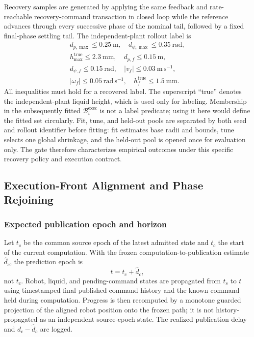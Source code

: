 Recovery samples are generated by applying the same feedback and
rate-reachable recovery-command transaction in closed loop while the reference advances through every
successive phase of the nominal tail, followed by a fixed final-phase settling
tail.  The independent-plant rollout label is
\begin{equation}
\begin{gathered}
  d_{p,\max}\le0.25~\mathrm{m},\quad
  d_{\psi,\max}\le0.35~\mathrm{rad},\\
  h_{\max}^{\mathrm{true}}\le2.3~\mathrm{mm},\quad
  d_{p,f}\le0.15~\mathrm{m},\\
  d_{\psi,f}\le0.15~\mathrm{rad},\quad
  |v_f|\le0.03~\mathrm{m\,s^{-1}},\\
  |\omega_f|\le0.05~\mathrm{rad\,s^{-1}},\quad
  h_f^{\mathrm{true}}\le1.5~\mathrm{mm}.
\end{gathered}
\label{eq:recovery_rollout_label}
\end{equation}
All inequalities must hold for a recovered label.  The superscript ``true''
denotes the independent-plant liquid height, which is used only for labeling.
Membership in the subsequently fitted $\mathcal B_i^{\mathrm{exec}}$ is not a
label predicate; using it here would define the fitted set circularly.  Fit,
tune, and held-out pools are separated by both seed and rollout identifier before fitting:
fit estimates base radii and bounds, tune selects one global shrinkage, and the
held-out pool is opened once for evaluation only.  The gate therefore
characterizes empirical outcomes under this specific recovery policy and
execution contract.

\subsection{Execution-Front Alignment and Phase Rejoining}

\subsubsection{Expected publication epoch and horizon}

Let $t_s$ be the common source epoch of the latest admitted state and $t_c$ the
start of the current computation.  With the frozen computation-to-publication
estimate $\widehat d_c$, the prediction epoch is
\begin{equation}
  t=t_c+\widehat d_c,
  \label{eq:publication_epoch}
\end{equation}
not $t_c$.  Robot, liquid, and pending-command states are propagated from $t_s$
to $t$ using timestamped final published-command history and the known command
held during computation.  Progress is then recomputed by a monotone guarded
projection of the aligned robot position onto the frozen path; it is not
history-propagated as an independent source-epoch state.  The realized
publication delay and $d_c-\widehat d_c$ are logged.

